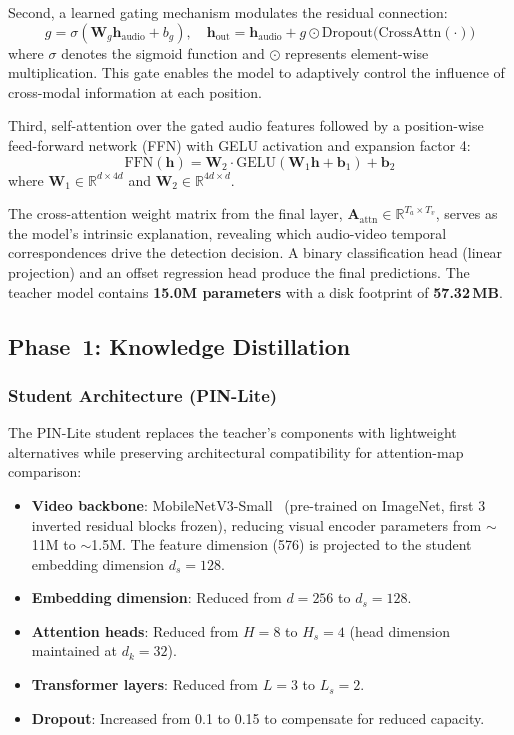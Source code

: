 \documentclass[lettersize,journal]{IEEEtran}
\begin{document}
Second, a learned gating mechanism modulates the residual connection:
\begin{equation}
\label{eq:gate}
    g = \sigma(\mathbf{W}_g \mathbf{h}_{\text{audio}} + b_g), \quad
    \mathbf{h}_{\text{out}} = \mathbf{h}_{\text{audio}} + g \odot \text{Dropout}\bigl(\text{CrossAttn}(\cdot)\bigr)
\end{equation}
where $\sigma$ denotes the sigmoid function and $\odot$ represents element-wise multiplication. This gate enables the model to adaptively control the influence of cross-modal information at each position.

Third, self-attention over the gated audio features followed by a position-wise feed-forward network (FFN) with GELU activation and expansion factor 4:
\begin{equation}
    \text{FFN}(\mathbf{h}) = \mathbf{W}_2 \cdot \text{GELU}(\mathbf{W}_1 \mathbf{h} + \mathbf{b}_1) + \mathbf{b}_2
\end{equation}
where $\mathbf{W}_1 \in \mathbb{R}^{d \times 4d}$ and $\mathbf{W}_2 \in \mathbb{R}^{4d \times d}$.

The cross-attention weight matrix from the final layer, $\mathbf{A}_{\text{attn}} \in \mathbb{R}^{T_a \times T_v}$, serves as the model's intrinsic explanation, revealing which audio-video temporal correspondences drive the detection decision. A binary classification head (linear projection) and an offset regression head produce the final predictions. The teacher model contains \textbf{15.0M parameters} with a disk footprint of \textbf{57.32\,MB}.


\subsection{Phase~1: Knowledge Distillation}
\label{sec:kd}

\subsubsection{Student Architecture (PIN-Lite)}
The PIN-Lite student replaces the teacher's components with lightweight alternatives while preserving architectural compatibility for attention-map comparison:
\begin{itemize}
    \item \textbf{Video backbone}: MobileNetV3-Small~\cite{howard2019mobilenetv3} (pre-trained on ImageNet, first 3 inverted residual blocks frozen), reducing visual encoder parameters from $\sim$11M to $\sim$1.5M. The feature dimension (576) is projected to the student embedding dimension $d_s = 128$.
    \item \textbf{Embedding dimension}: Reduced from $d = 256$ to $d_s = 128$.
    \item \textbf{Attention heads}: Reduced from $H = 8$ to $H_s = 4$ (head dimension maintained at $d_k = 32$).
    \item \textbf{Transformer layers}: Reduced from $L = 3$ to $L_s = 2$.
    \item \textbf{Dropout}: Increased from 0.1 to 0.15 to compensate for reduced capacity.
\end{itemize}
\end{document}
